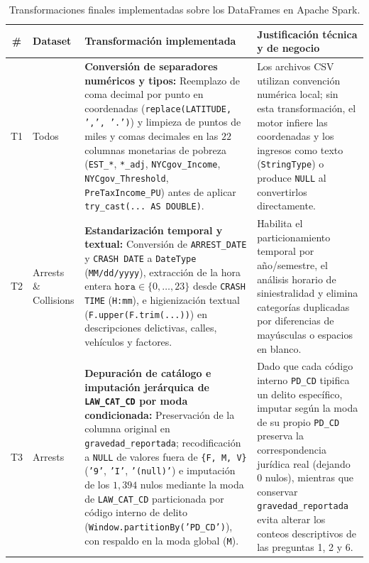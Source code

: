 \documentclass[11pt,a4paper]{article}
\begin{document}
\begin{table}[H]
\centering
\scriptsize
\renewcommand{\arraystretch}{1.25}
\caption{Transformaciones finales implementadas sobre los DataFrames en Apache Spark.}
\label{tab:transformaciones_finales}
\begin{tabularx}{\linewidth}{c l >{\raggedright\arraybackslash}p{4.3cm} X}
\toprule
\textbf{\#} & \textbf{Dataset} & \textbf{Transformación implementada} & \textbf{Justificación técnica y de negocio} \\
\midrule
T1 & Todos & \textbf{Conversión de separadores numéricos y tipos:} Reemplazo de coma decimal por punto en coordenadas (\texttt{replace(LATITUDE, ',', '.')}) y limpieza de puntos de miles y comas decimales en las $22$ columnas monetarias de pobreza (\texttt{EST\_*}, \texttt{*\_adj}, \texttt{NYCgov\_Income}, \texttt{NYCgov\_Threshold}, \texttt{PreTaxIncome\_PU}) antes de aplicar \texttt{try\_cast(... AS DOUBLE)}. & Los archivos CSV utilizan convención numérica local; sin esta transformación, el motor infiere las coordenadas y los ingresos como texto (\texttt{StringType}) o produce \texttt{NULL} al convertirlos directamente. \\
T2 & Arrests \& Collisions & \textbf{Estandarización temporal y textual:} Conversión de \texttt{ARREST\_DATE} y \texttt{CRASH DATE} a \texttt{DateType} (\texttt{MM/dd/yyyy}), extracción de la hora entera $\texttt{hora} \in \{0,\dots,23\}$ desde \texttt{CRASH TIME} (\texttt{H:mm}), e higienización textual (\texttt{F.upper(F.trim(...))}) en descripciones delictivas, calles, vehículos y factores. & Habilita el particionamiento temporal por año/semestre, el análisis horario de siniestralidad y elimina categorías duplicadas por diferencias de mayúsculas o espacios en blanco. \\
T3 & Arrests & \textbf{Depuración de catálogo e imputación jerárquica de \texttt{LAW\_CAT\_CD} por moda condicionada:} Preservación de la columna original en \texttt{gravedad\_reportada}; recodificación a \texttt{NULL} de valores fuera de \texttt{\{F, M, V\}} (\texttt{'9'}, \texttt{'I'}, \texttt{'(null)'}) e imputación de los $1,394$ nulos mediante la moda de \texttt{LAW\_CAT\_CD} particionada por código interno de delito (\texttt{Window.partitionBy('PD\_CD')}), con respaldo en la moda global (\texttt{M}). & Dado que cada código interno \texttt{PD\_CD} tipifica un delito específico, imputar según la moda de su propio \texttt{PD\_CD} preserva la correspondencia jurídica real (dejando $0$ nulos), mientras que conservar \texttt{gravedad\_reportada} evita alterar los conteos descriptivos de las preguntas 1, 2 y 6. \\

\end{tabularx}
\end{table}
\end{document}
